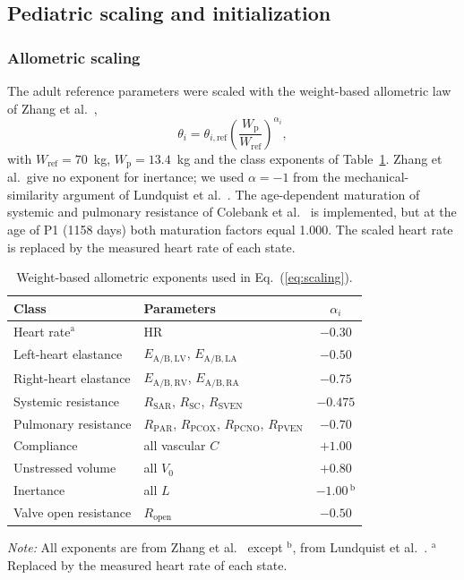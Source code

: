 \FloatBarrier
\subsection{Pediatric scaling and initialization}
\label{sec:scaling}

\subsubsection{Allometric scaling}
The adult reference parameters were scaled with the weight-based allometric law of Zhang et al.~\cite{zhang2019multiscale},
\begin{equation}
\theta_i = \theta_{i,\mathrm{ref}} \left(\frac{W_{\mathrm{p}}}{W_{\mathrm{ref}}}\right)^{\alpha_i},
\label{eq:scaling}
\end{equation}
with $W_{\mathrm{ref}} = 70$~kg, $W_{\mathrm{p}} = 13.4$~kg and the class exponents of Table~\ref{tab:exponents}. Zhang et al.\ give no exponent for inertance; we used $\alpha = -1$ from the mechanical-similarity argument of Lundquist et al.~\cite{Lundquist2025}. The age-dependent maturation of systemic and pulmonary resistance of Colebank et al.~\cite{Colebank2026} is implemented, but at the age of P1 (1158 days) both maturation factors equal 1.000. The scaled heart rate is replaced by the measured heart rate of each state.

\begin{table}[!htbp]
\centering\small
\caption{Weight-based allometric exponents used in Eq.~(\ref{eq:scaling}).}
\label{tab:exponents}
\begin{tabular}{llc}
\toprule
\textbf{Class} & \textbf{Parameters} & $\alpha_i$ \\
\midrule
Heart rate$^{\mathrm{a}}$ & HR & $-0.30$ \\
Left-heart elastance & $E_{\mathrm{A/B,LV}}$, $E_{\mathrm{A/B,LA}}$ & $-0.50$ \\
Right-heart elastance & $E_{\mathrm{A/B,RV}}$, $E_{\mathrm{A/B,RA}}$ & $-0.75$ \\
Systemic resistance & $R_{\mathrm{SAR}}$, $R_{\mathrm{SC}}$, $R_{\mathrm{SVEN}}$ & $-0.475$ \\
Pulmonary resistance & $R_{\mathrm{PAR}}$, $R_{\mathrm{PCOX}}$, $R_{\mathrm{PCNO}}$, $R_{\mathrm{PVEN}}$ & $-0.70$ \\
Compliance & all vascular $C$ & $+1.00$ \\
Unstressed volume & all $V_0$ & $+0.80$ \\
Inertance & all $L$ & $-1.00$\,$^{\mathrm{b}}$ \\
Valve open resistance & $R_{\mathrm{open}}$ & $-0.50$ \\
\bottomrule
\end{tabular}
\par\vspace{2pt}
\begin{minipage}{0.8\linewidth}
\raggedright\footnotesize
\emph{Note:} All exponents are from Zhang et al.~\cite{zhang2019multiscale} except $^{\mathrm{b}}$, from Lundquist et al.~\cite{Lundquist2025}. $^{\mathrm{a}}$Replaced by the measured heart rate of each state.
\end{minipage}
\end{table}

